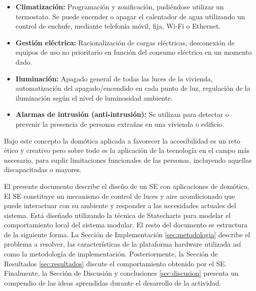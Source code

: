 \documentclass[journal]{IEEEtran}
\begin{document}
\begin{itemize}
	\item \textbf{Climatización:} Programación y zonificación, pudiéndose utilizar un termostato. Se puede encender o apagar el calentador de agua utilizando un control de enchufe, mediante telefonía móvil, fija, Wi-Fi o Ethernet.

	\item \textbf{Gestión eléctrica:} Racionalización de cargas eléctricas, desconexión de equipos de uso no prioritario en función del consumo eléctrico en un momento dado.

	\item \textbf{Iluminación:} Apagado general de todas las luces de la vivienda, automatización del apagado/encendido en cada punto de luz, regulación de la iluminación según el nivel de luminosidad ambiente.

	\item \textbf{Alarmas de intrusión (anti-intrusión):} Se utilizan para detectar o prevenir la presencia de personas extrañas en una vivienda o edificio.
\end{itemize}

Bajo este concepto la domótica aplicada a favorecer la accesibilidad es un reto ético y creativo pero sobre todo es la aplicación de la tecnología en el campo más necesario, para suplir limitaciones funcionales de las personas, incluyendo aquellas discapacitadas o mayores. 


El presente documento describe el diseño de un SE con aplicaciones de domótica.
El SE constituye un mecanismo de control de luces y aire acondicionado que puede interactuar con su ambiente y responder a las necesidades actuales del sistema.
Está diseñado utilizando la técnica de Statecharts para modelar el comportamiento local del sistema modular.
El resto del documento se estructura de la siguiente forma. 
La Sección de Implementación \ref{sec:metodologia} describe el problema a resolver, las características de la plataforma hardware utilizada así como la metodología de implementación.
Posteriormente, la Sección de Resultados \ref{sec:resultados} discute el comportamiento obtenido por el SE.
Finalmente, la Sección de Discusión y conclusiones \ref{sec:discusion} presenta un compendio de las ideas aprendidas durante el desarrollo de la actividad.
\end{document}
